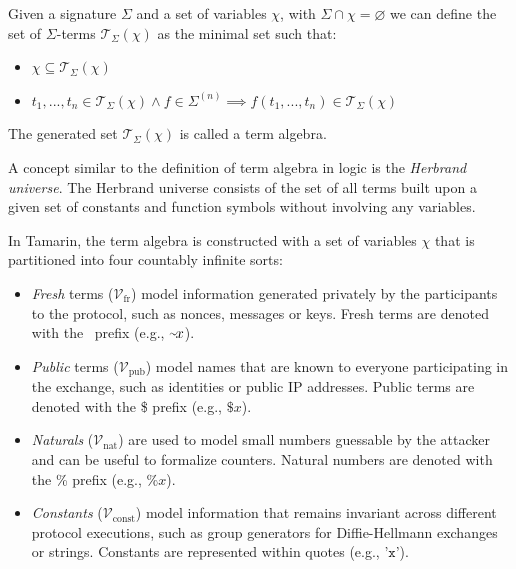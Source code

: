 \begin{definition}
    Given a signature $\Sigma$ and a set of variables $\chi$, with $\Sigma \cap \chi = \varnothing$ we can define the set of $\Sigma$-terms $\mathcal{T}_{\Sigma}(\chi)$ as the minimal set such that:

    \begin{itemize}
        \item $\chi \subseteq \mathcal{T}_{\Sigma}(\chi)$
        \item $t_1,...,t_n \in \mathcal{T}_{\Sigma}(\chi) \land f \in \Sigma^{(n)} \implies f(t_1,...,t_n) \in \mathcal{T}_{\Sigma}(\chi)$
    \end{itemize}

    \noindent The generated set $\mathcal{T}_\Sigma(\chi)$ is called a term algebra.
\end{definition}

A concept similar to the definition of term algebra in logic is the \textit{Herbrand universe}. The Herbrand universe consists of the set of all terms built upon a given set of constants and function symbols without involving any variables.

In Tamarin, the term algebra is constructed with a set of variables $\chi$ that is partitioned into four countably infinite sorts:
\begin{itemize}
    \item \textit{Fresh} terms ($\mathcal{V}_\text{fr}$) model information generated privately by the participants to the protocol, such as nonces, messages or keys. Fresh terms are denoted with the \fr ~prefix (e.g., $\fr x$).
    \item \textit{Public} terms ($\mathcal{V}_\text{pub}$) model names that are known to everyone participating in the exchange, such as identities or public IP addresses. Public terms are denoted with the \$ prefix (e.g., $\$ x$).
    \item \textit{Naturals} ($\mathcal{V}_\text{nat}$) are used to model small numbers guessable by the attacker and can be useful to formalize counters. Natural numbers are denoted with the \% prefix (e.g., $\% x$).
    \item \textit{Constants} ($\mathcal{V}_\text{const}$) model information that remains invariant across different protocol executions, such as group generators for Diffie-Hellmann exchanges or strings. Constants are represented within quotes (e.g., $\texttt{'x'}$).
\end{itemize}

